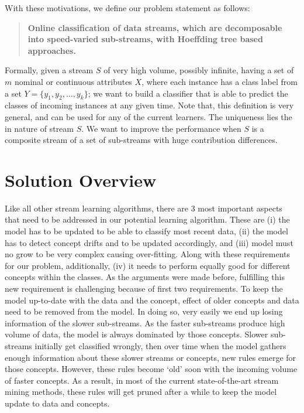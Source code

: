With these motivations, we define our problem statement as follows:

\begin{quotation}
    \textbf{Online classification of data streams, which are decomposable into speed-varied sub-streams, with Hoeffding tree based approaches.}
\end{quotation}

\noindent Formally, given a stream $S$ of very high volume, possibly infinite, having a set of $m$ nominal or continuous attributes $X$, where each instance has a class label from a set $Y = \{y_1, y_2, \dots, y_k\}$; we want to build a classifier that is able to predict the classes of incoming instances at any given time. Note that, this definition is very general, and can be used for any of the current learners. The uniqueness lies the in nature of stream $S$. We want to improve the performance when $S$ is a composite stream of a set of sub-streams with huge contribution differences.


\section{Solution Overview}
Like all other stream learning algorithms, there are 3 most important aspects that need  to be addressed in our potential learning algorithm. These are (i) the model has to be updated to be able to classify most recent data, (ii) the model has to detect concept drifts and to be updated accordingly, and (iii) model must no grow to be very complex causing over-fitting. Along with these requirements for our problem, additionally, (iv) it needs to perform equally good for different concepts within the classes. As the arguments were made before, fulfilling this new requirement is challenging because of first two requirements. To keep the model up-to-date with the data and the concept, effect of older concepts and data need to be removed from the model. In doing so, very easily we end up losing information of the slower sub-streams. As the faster sub-streams produce high volume of data, the model is always dominated by those concepts. Slower sub-streams initially get classified wrongly, then over time when the model gathers enough information about these slower streams or concepts, new rules emerge for those concepts. However, these rules become `old'  soon with the incoming volume of faster concepts. As a result, in most of the current state-of-the-art stream mining methods, these rules will get pruned after a while to keep the model update to data and concepts.


